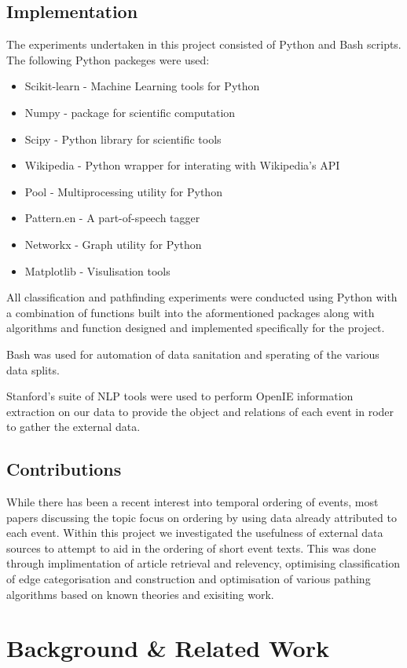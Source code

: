 \documentclass[bsc,frontabs,twoside,singlespacing,parskip,deptreport]{infthesis}     %
\begin{document}
\section{Implementation}
The experiments undertaken in this project consisted of Python and Bash scripts.
The following Python packeges were used:
\begin{itemize}
\item Scikit-learn - Machine Learning tools for Python
\item Numpy - package for scientific computation
\item Scipy - Python library for scientific tools
\item Wikipedia - Python wrapper for interating with Wikipedia's API
\item Pool - Multiprocessing utility for Python
\item Pattern.en - A part-of-speech tagger 
\item Networkx - Graph utility for Python
\item Matplotlib - Visulisation tools
\end{itemize}
All classification and pathfinding experiments were conducted using Python with a combination of
functions built into the aformentioned packages along with algorithms and function designed and implemented
specifically for the project.

Bash was used for automation of data sanitation and sperating of the various data splits. 

Stanford's suite of NLP tools were used to perform OpenIE information extraction on our data to provide the
object and relations of each event in roder to gather the external data.
\section{Contributions}
While there has been a recent interest into temporal ordering of events, most papers discussing the topic focus on
ordering by using data already attributed to each event. Within this project we investigated the usefulness of
external data sources to attempt to aid in the ordering of short event texts. This was done through implimentation
of article retrieval and relevency, optimising classification of edge categorisation and construction and optimisation
of various pathing algorithms based on known theories and exisiting work. 
\chapter{Background \& Related Work}
\end{document}
